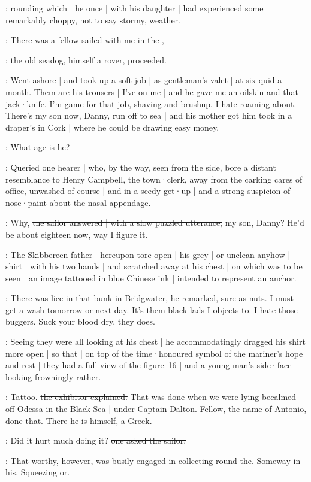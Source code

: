 :
rounding which |
he once |
with his daughter |
had experienced some remarkably choppy,
not to say stormy,
weather.

\Murphy:
There was a fellow sailed with me in the ,

:
the old seadog,
himself a rover,
proceeded.

\Murphy:
Went ashore |
and took up a soft job |
as gentleman's valet |
at six quid a month.
Them are his trousers |
I've on me |
and he gave me an oilskin and that jack·knife.
I'm game for that job,
shaving and brushup.
I hate roaming about.
There's my son now,
Danny,
run off to sea |
and his mother got him took in a draper's in Cork |
where he could be drawing easy money.

\Campbell:
What age is he?

:
Queried one hearer |
who,
by the way,
seen from the side,
bore a distant resemblance to Henry Campbell,
the town·clerk,
away from the carking cares of office,
unwashed of course |
and in a seedy get·up |
and a strong suspicion of nose·paint about the nasal appendage.

\Murphy:
Why,
\sout{the sailor answered |
with a slow puzzled utterance,}
my son,
Danny?
He'd be about eighteen now,
way I figure it.

:
The Skibbereen father |
hereupon tore open |
his grey |
or unclean anyhow |
shirt |
with his two hands |
and scratched away at his chest |
on which was to be seen |
an image tattooed in blue Chinese ink |
intended to represent an anchor.

\Murphy:
There was lice in that bunk in Bridgwater,%
\sout{he remarked,}
sure as nuts.
I must get a wash tomorrow or next day.
It's them black lads I objects to.
I hate those buggers.
Suck your blood dry,
they does.

:
Seeing they were all looking at his chest |
he accommodatingly dragged his shirt more open |
so that |
on top of the time·honoured symbol of the mariner's hope and rest |
they had a full view of the figure~16 |
and a young man's side·face looking frowningly rather.

\Murphy:
Tattoo.
\sout{the exhibitor explained.}
That was done when we were lying becalmed |
off Odessa in the Black Sea |
under Captain Dalton.
Fellow,
the name of Antonio,
done that.
There he is himself,
a Greek.

\Someone:
Did it hurt much doing it?%
\sout{one asked the sailor.}

:
That worthy,
however,
was busily engaged in collecting round the.
Someway in his.
Squeezing or.

